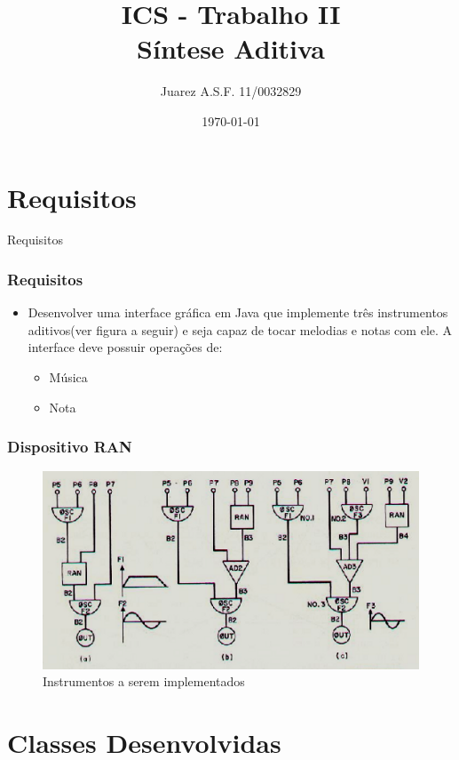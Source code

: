 \documentclass{beamer}
\title[Introdução a Computação Sônica]{ ICS - Trabalho II \\ Síntese Aditiva}
\author{Juarez A.S.F. 11/0032829}
\institute{Universidade de Brasília}
\date{\today}
\begin{document}
\begin{frame}
        \titlepage
\end{frame}

\section{Requisitos}
\begin{frame}{Requisitos}
	\frametitle{Requisitos}
    \begin{itemize}
	\item Desenvolver uma interface gráfica em Java que implemente três instrumentos aditivos(ver figura a seguir) 
	e seja capaz de tocar melodias e notas com ele. A interface deve possuir operações de:
	\begin{itemize}
	 \item Música
	 \item Nota
	 \end{itemize}
    \end{itemize}
\end{frame}

\begin{frame}
 \frametitle{Dispositivo RAN}
 \begin{figure}
  \includegraphics[scale=0.6]{./images/meusInstrumentos.png}
  \caption{Instrumentos a serem implementados}
   \end{figure}
\end{frame}

\section{Classes Desenvolvidas}
\end{document}

